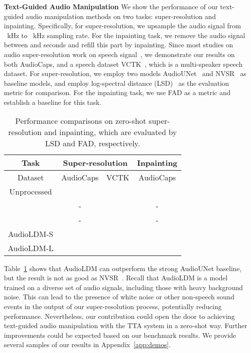 \documentclass{article}
\begin{document}
\textbf{Text-Guided Audio Manipulation} We show the performance of our text-guided audio manipulation methods on two tasks: super-resolution and inpainting. Specifically, for super-resolution, we upsample the audio signal from ~kHz to ~kHz sampling rate. For the inpainting task, we remove the audio signal between  and  seconds and refill this part by inpainting. Since most studies on audio super-resolution work on speech signal~\cite{liu2021voicefixer, liu2022neural}, we demonstrate our results on both AudioCaps, and a speech dataset VCTK~\cite{vctk-yamagishi2019cstr}, which is a multi-speaker speech dataset. For super-resolution, we employ two models AudioUNet~\cite{kuleshov2017audio} and NVSR~\cite{liu2022neural} as baseline models, and employ log-spectral distance (LSD)~\cite{heming-towards-sr-wang2021towards} as the evaluation metric for comparison. For the inpainting task, we use FAD as a metric and establish a baseline for this task. 
\begin{table}[tbp]
\centering
\small
\begin{tabular}{cccc}
\toprule
Task          & \multicolumn{2}{c}{Super-resolution}  &  Inpainting     \\
\midrule
Dataset       & AudioCaps            & VCTK                 & AudioCaps            \\
\midrule
Unprocessed   &                      &                      &                      \\
\citet{kuleshov2017audio}     & -                    &                  & -                    \\
\citet{liu2022neural}          & -                    &                  & -                    \\
AudioLDM-S &                      &                      &                      \\
AudioLDM-L &  &  &  \\
\bottomrule
\end{tabular}
\caption{Performance comparisons on zero-shot super-resolution and inpainting, which are evaluated by LSD and FAD, respectively.}
\label{tab: audiomanipulation}
\end{table}
Table~\ref{tab: audiomanipulation} shows that AudioLDM can outperform the strong AudioUNet baseline, but the result is not as good as NVSR~\cite{liu2022neural}. 
Recall that AudioLDM is a model trained on a diverse set of audio signals, including those with heavy background noise. This can lead to the presence of white noise or other non-speech sound events in the output of our super-resolution process, potentially reducing performance. 
Nevertheless, our contribution could open the door to achieving text-guided audio manipulation with the TTA system in a zero-shot way. Further improvements could be expected based on our benchmark results. We provide several samples of our results in Appendix~\ref{app:demos}. 
\end{document}
